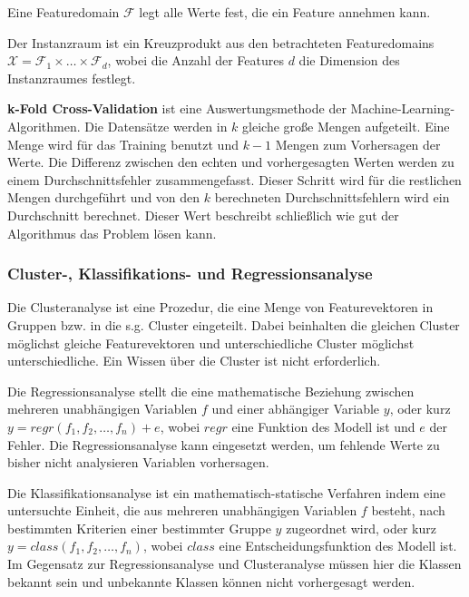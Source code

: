 \begin{term}[Featuredomain]
	Eine Featuredomain $\mathscr{F}$ legt alle Werte fest, die ein Feature annehmen kann. 
\end{term}

\begin{term}[Instanzraum]
Der Instanzraum ist ein Kreuzprodukt aus den betrachteten Featuredomains $\mathscr{X} = \mathscr{F}_1 \times \dots \times \mathscr{F}_d$, wobei die Anzahl der Features $d$ die Dimension des Instanzraumes festlegt.
\end{term}


\begin{term}
\textbf{k-Fold Cross-Validation} ist eine Auswertungsmethode der Machine-Learning-Algorithmen. 
Die Datensätze werden in $k$ gleiche große Mengen aufgeteilt. 
Eine Menge wird für das Training benutzt und $k-1$ Mengen zum Vorhersagen der Werte. 
Die Differenz zwischen den echten und vorhergesagten Werten werden zu einem Durchschnittsfehler zusammengefasst. 
Dieser Schritt wird für die restlichen Mengen durchgeführt und von den $k$ berechneten Durchschnittsfehlern wird ein Durchschnitt berechnet. 
Dieser Wert beschreibt schließlich wie gut der Algorithmus das Problem lösen kann.
\end{term}

\subsubsection{Cluster-, Klassifikations- und Regressionsanalyse}
Die Clusteranalyse ist eine Prozedur, die eine Menge von Featurevektoren in Gruppen bzw. in die s.g. Cluster eingeteilt. Dabei beinhalten die gleichen Cluster möglichst gleiche Featurevektoren und unterschiedliche Cluster möglichst unterschiedliche. Ein Wissen über die Cluster ist nicht erforderlich.

Die Regressionsanalyse stellt die eine mathematische Beziehung zwischen mehreren unabhängigen Variablen $f$ und einer abhängiger Variable $y$, oder kurz $y = regr(f_1, f_2, \dots, f_n) + e$, wobei $regr$ eine Funktion des Modell ist und $e$ der Fehler.
Die Regressionsanalyse kann eingesetzt werden, um fehlende Werte zu bisher nicht analysieren Variablen vorhersagen.

Die Klassifikationsanalyse ist ein mathematisch-statische Verfahren indem eine untersuchte Einheit, die aus mehreren unabhängigen Variablen $f$ besteht, nach bestimmten Kriterien einer bestimmter Gruppe $y$ zugeordnet wird, oder kurz $y = class(f_1, f_2, \dots, f_n)$, wobei $class$ eine Entscheidungsfunktion des Modell ist. Im Gegensatz zur Regressionsanalyse und Clusteranalyse müssen hier die Klassen bekannt sein und unbekannte Klassen können nicht vorhergesagt werden.


